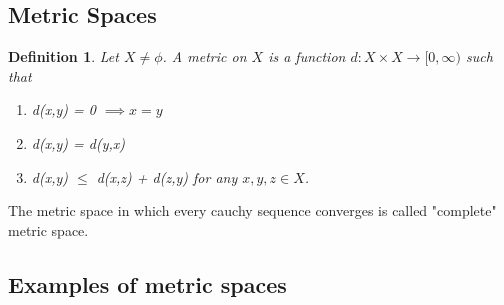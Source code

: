 \documentclass[12pt]{report}
\newtheorem{defn}{Definition}
\begin{document}
\subsection*{Metric Spaces}
\begin{defn}
    Let $X \neq \phi$. A metric on $X$ is a function $d:X \times X \to [0, \infty)$ such that 
    \begin{enumerate}
        \item d(x,y) = 0 $\implies x = y$
        \item d(x,y) = d(y,x)
        \item d(x,y) $\leq$ d(x,z) + d(z,y) for any $x,y,z \in X$.
    \end{enumerate}
\end{defn}
The metric space in which every cauchy sequence converges is called "complete" metric space.
\subsection*{Examples of metric spaces}
\end{document}
